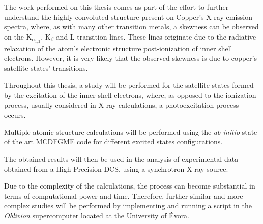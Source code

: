 
%

The work performed on this thesis comes as part of the effort to further understand the highly convoluted structure present on Copper's X-ray emission spectra, where, as with many other transition metals, a skewness can be observed on the K$_{\alpha_{1,2}}$, K$_{\beta}$ and L transition lines. These lines originate due to the radiative relaxation of the atom's electronic structure post-ionization of inner shell electrons.
However, it is very likely that the observed skewness is due to copper's satellite states' transitions.

Throughout this thesis, a study will be performed for the satellite states formed by the excitation of the inner-shell electrons, where, as opposed to the ionization process, usually considered in X-ray calculations, a photoexcitation process occurs.

 Multiple atomic structure calculations will be performed using the \textit{ab initio} state of the art \gls{MCDFGME} code for different excited states configurations.

 The obtained results will then be used in the analysis of experimental data obtained from a High-Precision \gls{DCS}, using a synchrotron X-ray source.

Due to the complexity of the calculations, the process can become substantial in terms of computational power and time. Therefore, further similar and more complex studies will be performed by implementing and running a script in the \textit{Oblivion} supercomputer located at the University of Évora.

